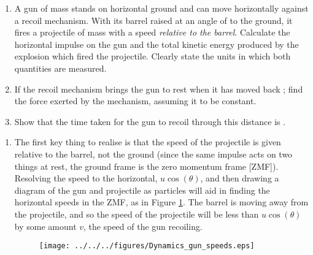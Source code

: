 
\begin{problem}[A1972AMIIQ2l] %
{\begin{enumerate}
	\item A gun of mass  stands on horizontal ground and can move horizontally against a recoil mechanism. With its barrel raised at an angle of  to the ground, it fires a projectile of mass  with a speed  \emph{relative to the barrel}. Calculate the horizontal impulse on the gun and the total kinetic energy produced by the explosion which fired the projectile. Clearly state the units in which both quantities are measured.
	\item If the recoil mechanism brings the gun to rest when it has moved back ; find the force exerted by the mechanism, assuming it to be constant.
	\item Show that the time taken for the gun to recoil through this distance is .
\end{enumerate}
}
{}
{\begin{enumerate}
	\item The first key thing to realise is that the speed of the projectile is given relative to the barrel, not the ground (since the same impulse acts on two things at rest, the ground frame is the zero momentum frame [ZMF]). Resolving the speed to the horizontal, $u \cos(\theta)$, and then drawing a diagram of the gun and projectile as particles will aid in finding the horizontal speeds in the ZMF, as in Figure \ref{fig:Dynamics_gun_speeds}. The barrel is moving away from the projectile, and so the speed of the projectile will be less than $u \cos(\theta)$ by some amount $v$, the speed of the gun recoiling.

\begin{figure}[h]
\centering
\texttt{[image: ../../../figures/Dynamics\_gun\_speeds.eps]}
\caption{}
\label{fig:Dynamics_gun_speeds}
\end{figure}


\end{enumerate}}
\end{problem}
